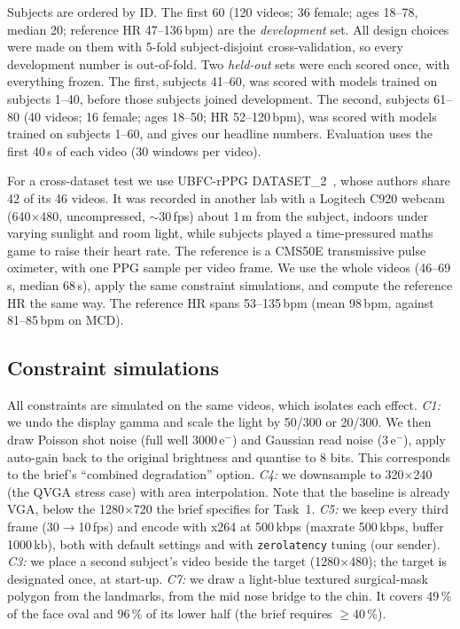 \documentclass[conference]{IEEEtran}
\newcommand{\bpm}{\,bpm}
\begin{document}
Subjects are ordered by ID. The first 60 (120 videos; 36 female; ages 18--78, median 20; reference HR
47--136\bpm) are the \textit{development} set. All design choices were made on them with 5-fold
subject-disjoint cross-validation, so every development number is out-of-fold. Two \textit{held-out}
sets were each scored once, with everything frozen. The first, subjects 41--60, was scored with models
trained on subjects 1--40, before those subjects joined development. The second, subjects 61--80 (40 videos; 16 female;
ages 18--50; HR 52--120\bpm), was scored with models trained on subjects 1--60, and gives our headline
numbers. Evaluation uses the first 40\,s of each video (30 windows per video).

For a cross-dataset test we use UBFC-rPPG DATASET\_2~\cite{bobbia2019}, whose authors share 42 of its
46 videos. It was recorded in another lab with a Logitech C920 webcam (640$\times$480, uncompressed,
${\sim}30$\,fps) about 1\,m from the subject, indoors under varying sunlight and room light, while subjects
played a time-pressured maths game to raise their heart rate. The reference is a CMS50E transmissive pulse
oximeter, with one PPG sample per video frame. We use the whole videos (46--69\,s, median 68\,s), apply
the same constraint simulations, and compute the reference HR the same way. The reference HR spans
53--135\bpm{} (mean 98\bpm, against 81--85\bpm{} on MCD).

\subsection{Constraint simulations}\label{sec:sim}
All constraints are simulated on the same videos, which isolates each effect.
\textit{C1:} we undo the display gamma and scale the light by 50/300 or 20/300. We then draw Poisson shot
noise (full well 3000\,e$^-$) and Gaussian read noise (3\,e$^-$), apply auto-gain back to the original
brightness and quantise to 8 bits. This corresponds to the brief's ``combined degradation'' option.
\textit{C4:} we downsample to 320$\times$240 (the QVGA stress case) with area interpolation. Note that the
baseline is already VGA, below the 1280$\times$720 the brief specifies for Task~1.
\textit{C5:} we keep every third frame (30$\to$10\,fps) and encode with x264 at 500\,kbps (maxrate
500\,kbps, buffer 1000\,kb), both with default settings and with \texttt{zerolatency} tuning (our sender).
\textit{C3:} we place a second subject's video beside the target (1280$\times$480); the target is
designated once, at start-up.
\textit{C7:} we draw a light-blue textured surgical-mask polygon from the landmarks, from the mid nose
bridge to the chin. It covers 49\,\% of the face oval and 96\,\% of its lower half (the brief requires
${\ge}40$\,\%).
\end{document}
